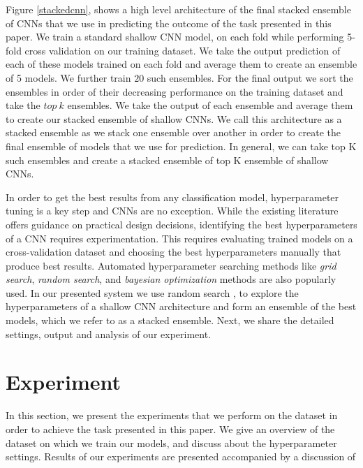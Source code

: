 \documentclass[conference]{IEEEtran}
\begin{document}
Figure \ref{stackedcnn}, shows a high level architecture of the final stacked ensemble of CNNs that we use in predicting the outcome of the task presented in this paper. We train a standard shallow CNN model, on each fold while performing 5-fold cross validation on our training dataset. We take the output prediction of each of these models trained on each fold and average them to create an ensemble of 5 models. We further train $20$ such ensembles. For the final output we sort the ensembles in order of their decreasing performance on the training dataset and take the $top \ k$ ensembles. We take the output of each ensemble and average them to create our stacked ensemble of shallow CNNs.  We call this architecture as a stacked ensemble as we stack one ensemble over another in order to create the final ensemble of models that we use for prediction. In general, we can take top K such ensembles and create a stacked ensemble of top K ensemble of shallow CNNs.

In order to get the best results from any classification model, hyperparameter tuning is a key step and CNNs are no exception. While the existing literature offers guidance on practical design decisions, identifying the best hyperparameters of a CNN requires experimentation. This requires evaluating trained models on a cross-validation dataset and choosing the best hyperparameters manually that produce best results. Automated hyperparameter searching methods like \textit{grid search}, \textit{random search}, and \textit{bayesian optimization} methods are also popularly used. In our presented system we use random search \cite{bergstra2012random}, to explore the hyperparameters of a shallow CNN architecture and form an ensemble of the best models, which we refer to as a stacked ensemble. Next, we share the detailed settings, output and analysis of our experiment.

\section{Experiment} 
In this section, we present the experiments that we perform on the dataset in order to achieve the task presented in this paper. We give an overview of the dataset on which we train our models, and discuss about the hyperparameter settings. Results of our experiments are presented accompanied by a discussion of 
\end{document}
